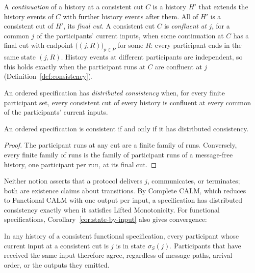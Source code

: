 A \emph{continuation} of a history at a consistent cut $C$ is a history $H'$
that extends the history events of $C$ with further history events after
them.  All of $H'$ is a consistent cut of $H'$, its \emph{final cut}.  A
consistent cut $C$ is \emph{confluent at} $j$, for a common \indesc $j$ of
the participants' current inputs, when some continuation at $C$ has a final
cut with endpoint $\bigl((j,R)\bigr)_{p\in P}$ for some $R$: every
participant ends in the same state $(j,R)$.  History events at different
participants are independent, so this holds exactly when the participant runs at $C$ are
confluent at $j$ (Definition~\ref{def:consistency}).

\begin{definition}
\label{def:distributed-consistency}
An ordered specification has \emph{distributed consistency} when, for every
finite participant set, every consistent cut of every history is confluent
at every common \indesc of the participants' current inputs.
\end{definition}

\begin{proposition}
\label{prop:distributed-consistency}
An ordered specification is consistent if and only if it has distributed
consistency.
\end{proposition}

\begin{proof}
The participant runs at any cut are a finite family of runs.  Conversely,
every finite family of runs is the family of participant runs of a
message-free history, one participant per run, at its final cut.
\end{proof}

Neither notion asserts that a protocol delivers $j$, communicates, or
terminates; both are existence claims about transitions.  By Complete CALM,
which reduces to Functional CALM with one output per input, a specification
has distributed consistency exactly when it satisfies Lifted Monotonicity.
For functional specifications,
Corollary~\ref{cor:state-by-input} also gives convergence:

\begin{corollary}[Convergence]
\label{cor:convergence}
In any history of a consistent functional specification, every
participant whose current input at a consistent cut is $j$ is in state
$\sigma_S(j)$.  Participants that have received the same input therefore agree,
regardless of message paths, arrival order, or the outputs they emitted.
\end{corollary}


